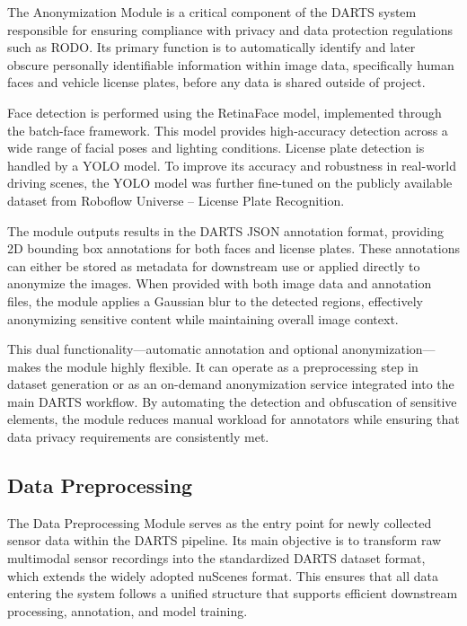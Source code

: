 \documentclass[conference]{IEEEtran}
\begin{document}
The Anonymization Module is a critical component of the DARTS system responsible for ensuring compliance with privacy and data protection regulations such as RODO. Its primary function is to automatically identify and later obscure personally identifiable information within image data, specifically human faces and vehicle license plates, before any data is shared outside of project.

Face detection is performed using the RetinaFace\cite{deng2019retinaface} model, implemented through the batch-face framework. This model provides high-accuracy detection across a wide range of facial poses and lighting conditions. License plate detection is handled by a YOLO model. To improve its accuracy and robustness in real-world driving scenes, the YOLO model was further fine-tuned on the publicly available dataset from Roboflow Universe – License Plate Recognition.

The module outputs results in the DARTS JSON annotation format, providing 2D bounding box annotations for both faces and license plates. These annotations can either be stored as metadata for downstream use or applied directly to anonymize the images. When provided with both image data and annotation files, the module applies a Gaussian blur to the detected regions, effectively anonymizing sensitive content while maintaining overall image context.

This dual functionality—automatic annotation and optional anonymization—makes the module highly flexible. It can operate as a preprocessing step in dataset generation or as an on-demand anonymization service integrated into the main DARTS workflow. By automating the detection and obfuscation of sensitive elements, the module reduces manual workload for annotators while ensuring that data privacy requirements are consistently met.

\subsection{Data Preprocessing}

The Data Preprocessing Module serves as the entry point for newly collected sensor data within the DARTS pipeline. Its main objective is to transform raw multimodal sensor recordings into the standardized DARTS dataset format, which extends the widely adopted nuScenes format. This ensures that all data entering the system follows a unified structure that supports efficient downstream processing, annotation, and model training.
\end{document}

